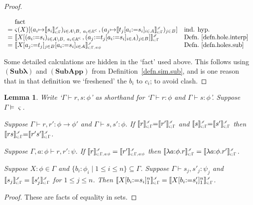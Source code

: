 \documentclass[submission,copyright]{eptcs}
\newtheorem{lemm}[thrm]{Lemma}
\newcommand{\lam}[1]{\lambda{#1}.}
\newcommand{\rulefont}[1]{\ensuremath{(\mathbf{#1})}}
\newcommand{\sm}{\mapsto}
\newcommand{\ssm}{:=}
\newcommand\fto{{\to}}
\newcommand\den[1]{{\hspace{.00ex}\scalebox{.55}{$#1$}}}
\newcommand{\idenot}[2]{\denot{\interp I}{#1}{#2}}
\newcommand\interp[1]{\ensuremath{\mathscr #1}}
\newcommand{\denot}[3]{\llbracket #3 \rrbracket_{\scalebox{.6}{$#2$}}^\den{#1}} \newcommand{\hdenot}[1]{\denot{\interp H}{}{#1}}
\newcommand\cent{\vdash}
\newcommand\ment{\vDash}
\newcommand\atomsdown{\mathbb A^{\hspace{-.3ex}{}_{{}^<}}}
\begin{document}
\begin{proof}
\begin{itemize*}
$$\begin{array}{r@{\ }l@{\quad}l}
&\text{fact}
\\
=&
\varsigma(X)[(a_i{\sm}\idenot{\varsigma;\Gamma}{s_i})_{i{\in}A{\setminus}B,\ a_i{\in}\atomsdown},(a_j{\sm}\idenot{\varsigma;\Gamma}{t_j[a_i{\ssm}s_i]_{i{\in}A}})_{j{\in}B}]
&\text{ind. hyp.}
\\
=&
\idenot{\varsigma;\Gamma}{X[(a_i{\ssm}s_i)_{i{\in}A{\setminus}B,\ a_i{\in}\atomsdown},(a_j{\ssm}t_j[a_i{\ssm}s_i]_{i{\in}A})_{j{\in}B}]}
&\text{Defn.~\ref{defn.hole.interp}}
\\
=&
\idenot{\varsigma;\Gamma,a{:}\phi}{X[a_j{\ssm}t_j]_{j{\in}B}[a_i{\ssm}s_i]_{i{\in}A}}
&\text{Defn.~\ref{defn.holes.sub}}
\end{array}
$$
\end{itemize*}
Some detailed calculations are hidden in the `fact' used above.
This follows using \rulefont{Sub\text{$\lambda$}} and \rulefont{SubApp} from Definition~\ref{defn.sim.sub}, and is one reason that in that definition we `freshened' the $b_i$ to $c_i$; to avoid clash.
\end{proof}


\begin{lemm}
\label{lemm.holes.beta.2}
Write `$\Gamma\cent r,s:\phi$' as shorthand for `$\Gamma\cent r:\phi$ and $\Gamma\cent s:\phi$'.
Suppose $\Gamma\ment\varsigma$.
\begin{enumerate*}
\item
Suppose $\Gamma\cent r,r':\phi\fto\phi'$ and $\Gamma\cent s,s':\phi$. 
If $\idenot{\varsigma;\Gamma}{r}{=}\idenot{\varsigma;\Gamma}{r'}$ and $\idenot{\varsigma;\Gamma}{s}{=}\idenot{\varsigma;\Gamma}{s'}$ then $\idenot{\varsigma;\Gamma}{rs}{=}\idenot{\varsigma;\Gamma}{r's'}$. 
\item
Suppose $\Gamma,a{:}\phi\cent r,r':\psi$.
If $\idenot{\varsigma;\Gamma,a{:}\phi}{r}=\idenot{\varsigma;\Gamma,a{:}\phi}{r'}$ then $\idenot{\varsigma;\Gamma}{\lam{a{:}\phi}r}=\idenot{\varsigma;\Gamma}{\lam{a{:}\phi}r'}$.
\item
Suppose $X{:}\phi\in\Gamma$ and $\{b_i{:}\phi_i\mid 1{\leq}i{\leq}n\}\subseteq\Gamma$.
Suppose $\Gamma\cent s_j,s'_j:\psi_j$ and $\idenot{\varsigma;\Gamma}{s_j}=\idenot{\varsigma;\Gamma}{s'_j}$ for $1{\leq}j{\leq}n$.
Then $\idenot{\varsigma;\Gamma}{X[b_i{\ssm}s_i]_1^n}=\idenot{\varsigma;\Gamma}{X[b_i{\ssm}s'_i]_1^n}$.

\end{enumerate*}
\end{lemm}
\begin{proof}
These are facts of equality in sets.
\end{proof}
\end{document}
